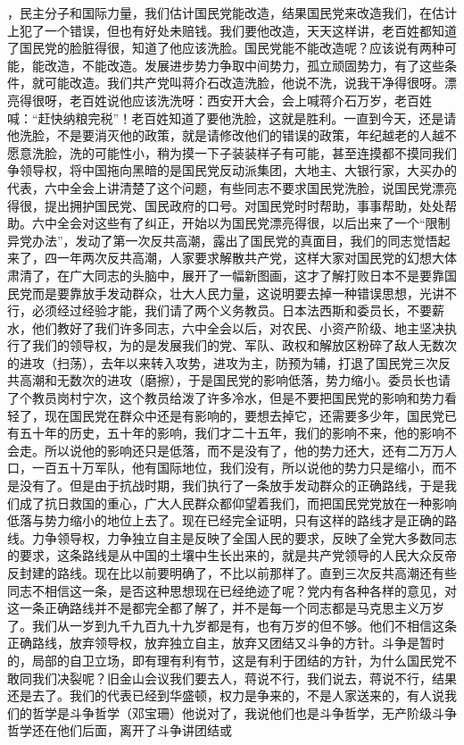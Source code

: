，民主分子和国际力量，我们估计国民党能改造，结果国民党来改造我们，在估计上犯了一个错误，但也有好处未赔钱。我们要他改造，天天这样讲，老百姓都知道了国民党的脸脏得很，知道了他应该洗脸。国民党能不能改造呢？应该说有两种可能，能改造，不能改造。发展进步势力争取中间势力，孤立顽固势力，有了这些条件，就可能改造。我们共产党叫蒋介石改造洗脸，他说不洗，说我干净得很呀。漂亮得很呀，老百姓说他应该洗洗呀：西安开大会，会上喊蒋介石万岁，老百姓喊：“赶快纳粮完税”！老百姓知道了要他洗脸，这就是胜利。一直到今天，还是请他洗脸，不是要消灭他的政策，就是请修改他们的错误的政策，年纪越老的人越不愿意洗脸，洗的可能性小，稍为摸一下子装装样子有可能，甚至连摸都不摸同我们争领导权，将中国拖向黑暗的是国民党反动派集团，大地主、大银行家，大买办的代表，六中全会上讲清楚了这个问题，有些同志不要求国民党洗脸，说国民党漂亮得很，提出拥护国民党、国民政府的口号。对国民党时时帮助，事事帮助，处处帮助。六中全会对这些有了纠正，开始以为国民党漂亮得很，以后出来了一个“限制异党办法”，发动了第一次反共高潮，露出了国民党的真面目，我们的同志觉悟起来了，四一年两次反共高潮，人家要求解散共产党，这样大家对国民党的幻想大体肃清了，在广大同志的头脑中，展开了一幅新图画，这才了解打败日本不是要靠国民党而是要靠放手发动群众，壮大人民力量，这说明要去掉一种错误思想，光讲不行，必须经过经验才能，我们请了两个义务教员。日本法西斯和委员长，不要薪水，他们教好了我们许多同志，六中全会以后，对农民、小资产阶级、地主坚决执行了我们的领导权，为的是发展我们的党、军队、政权和解放区粉碎了敌人无数次的进攻（扫荡），去年以来转入攻势，进攻为主，防预为辅，打退了国民党三次反共高潮和无数次的进攻（磨擦），于是国民党的影响低落，势力缩小。委员长也请了个教员岗村宁次，这个教员给泼了许多冷水，但是不要把国民党的影响和势力看轻了，现在国民党在群众中还是有影响的，要想去掉它，还需要多少年，国民党已有五十年的历史，五十年的影响，我们才二十五年，我们的影响不来，他的影响不会走。所以说他的影响还只是低落，而不是没有了，他的势力还大，还有二万万人口，一百五十万军队，他有国际地位，我们没有，所以说他的势力只是缩小，而不是没有了。但是由于抗战时期，我们执行了一条放手发动群众的正确路线，于是我们成了抗日救国的重心，广大人民群众都仰望着我们，而把国民党党放在一种影响低落与势力缩小的地位上去了。现在已经完全证明，只有这样的路线才是正确的路线。力争领导权，力争独立自主是反映了全国人民的要求，反映了全党大多数同志的要求，这条路线是从中国的土壤中生长出来的，就是共产党领导的人民大众反帝反封建的路线。现在比以前要明确了，不比以前那样了。直到三次反共高潮还有些同志不相信这一条，是否这种思想现在已经绝迹了呢？党内有各种各样的意见，对这一条正确路线并不是都完全都了解了，并不是每一个同志都是马克思主义万岁了。我们从一岁到九千九百九十九岁都是有，也有万岁的但不够。他们不相信这条正确路线，放弃领导权，放弃独立自主，放弃又团结又斗争的方针。斗争是暂时的，局部的自卫立场，即有理有利有节，这是有利于团结的方针，为什么国民党不敢同我们决裂呢？旧金山会议我们要去人，蒋说不行，我们说去，蒋说不行，结果还是去了。我们的代表已经到华盛顿，权力是争来的，不是人家送来的，有人说我们的哲学是斗争哲学（邓宝珊）他说对了，我说他们也是斗争哲学，无产阶级斗争哲学还在他们后面，离开了斗争讲团结或